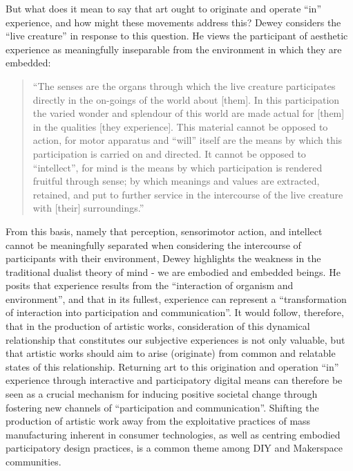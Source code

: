 But what does it mean to say that art ought to originate and operate “in” experience, and how might these movements address this? Dewey considers the “live creature” in response to this question. He views the participant of aesthetic experience as meaningfully inseparable from the environment in which they are embedded: 
\begin{quote}
    “The senses are the organs through which the live creature participates directly in the on-goings of the world about [them]. In this participation the varied wonder and splendour of this world are made actual for [them] in the qualities [they experience]. This material cannot be opposed to action, for motor apparatus and “will” itself are the means by which this participation is carried on and directed. It cannot be opposed to “intellect”, for mind is the means by which participation is rendered fruitful through sense; by which meanings and values are extracted, retained, and put to further service in the intercourse of the live creature with [their] surroundings.” \citeyearpar[p. 22]{dewey1934}
\end{quote}
From this basis, namely that perception, sensorimotor action, and intellect cannot be meaningfully separated when considering the intercourse of participants with their environment, Dewey highlights the weakness in the traditional dualist theory of mind -  we are embodied and embedded beings. He posits that experience results from the “interaction of organism and environment”,  and that in its fullest, experience can represent a “transformation of interaction into participation and communication”. It would follow, therefore, that in the production of artistic works, consideration of this dynamical relationship that constitutes our subjective experiences is not only valuable, but that artistic works should aim to arise (originate) from common and relatable states of this relationship.  Returning art to this origination and operation “in” experience through interactive and participatory digital means can therefore be seen as a crucial mechanism for inducing positive societal change through fostering new channels of “participation and communication”. Shifting the production of artistic work away from the exploitative practices of mass manufacturing inherent in consumer technologies, as well as centring embodied participatory design practices, is a common theme among DIY and Makerspace communities.%

